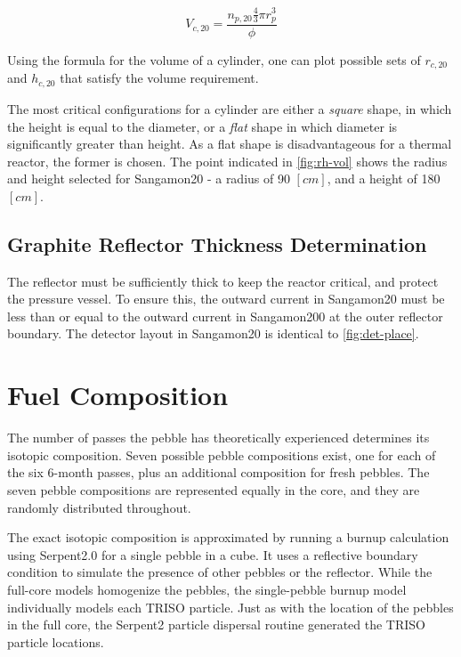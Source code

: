 \begin{equation}
V_{c,20} = \frac{ n_{p,20}\frac{4}{3}\pi r_{p}^3 }{ \phi }
\end{equation}

Using the formula for the volume of a cylinder, one can plot possible sets of $r_{c,20}$ and $h_{c,20}$ that satisfy the volume requirement.



The most critical configurations for a cylinder are either a \emph{square} shape, in which the height is equal to the diameter, or a \emph{flat} shape in which diameter is significantly greater than height.  As a flat shape is disadvantageous for a thermal reactor, the former is chosen.  The point indicated in \ref{fig:rh-vol} shows the radius and height selected for Sangamon20 - a radius of 90 $\left[cm\right]$, and a height of 180 $\left[cm\right]$.

\subsection{Graphite Reflector Thickness Determination}

The reflector must be sufficiently thick to keep the reactor critical, and protect the pressure vessel.  To ensure this, the outward current in Sangamon20 must be less than or equal to the outward current in Sangamon200 at the outer reflector boundary.  The detector layout in Sangamon20 is identical to \ref{fig:det-place}.

\section{Fuel Composition}

The number of passes the pebble has theoretically experienced determines its isotopic composition.  Seven possible pebble compositions exist, one for each of the six 6-month passes, plus an additional composition for fresh pebbles.  The seven pebble compositions are represented equally in the core, and they are randomly distributed throughout.

The exact isotopic composition is approximated by running a burnup calculation using Serpent2.0 for a single pebble in a cube.  It uses a reflective boundary condition to simulate the presence of other pebbles or the reflector.  While the full-core models homogenize the pebbles, the single-pebble burnup model individually models each TRISO particle.  Just as with the location of the pebbles in the full core, the Serpent2 particle dispersal routine generated the TRISO particle locations.

